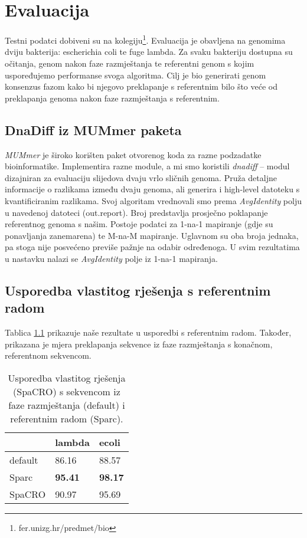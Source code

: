 \chapter{Evaluacija}
\label{sec:eval}

Testni podatci dobiveni su na kolegiju\footnote{fer.unizg.hr/predmet/bio}.
Evaluacija je obavljena na genomima dviju bakterija: escherichia coli te fuge lambda.
Za svaku bakteriju dostupna su očitanja, genom nakon faze razmještanja te referentni genom s kojim uspoređujemo performanse svoga algoritma.
Cilj je bio generirati genom konsenzus fazom kako bi njegovo preklapanje s referentnim bilo što veće od preklapanja genoma nakon faze razmještanja s referentnim.

\section{DnaDiff iz MUMmer paketa}

\emph{MUMmer} \citep{kurtz2004versatile} je široko korišten paket otvorenog koda  za razne podzadatke bioinformatike.
Implementira razne module, a mi smo koristili \emph{dnadiff} -- modul dizajniran za evaluaciju slijedova dvaju vrlo sličnih genoma.
Pruža detaljne informacije o razlikama između dvaju genoma, ali generira i high-level datoteku s kvantificiranim razlikama.
Svoj algoritam vrednovali smo prema \emph{AvgIdentity} polju u navedenoj datoteci (out.report).
Broj predstavlja prosječno poklapanje referentnog genoma s našim.
Postoje podatci za 1-na-1 mapiranje (gdje su ponavljanja zanemarena) te M-na-M mapiranje.
Uglavnom su oba broja jednaka, pa stoga nije posvećeno previše pažnje na odabir određenoga.
U svim rezultatima u nastavku nalazi se \emph{AvgIdentity} polje iz 1-na-1 mapiranja.

\section{Usporedba vlastitog rješenja s referentnim radom}

Tablica \ref{tbl:usporedba} prikazuje naše rezultate u usporedbi s referentnim radom. Također, prikazana je mjera preklapanja sekvence iz faze razmještanja s konačnom, referentnom sekvencom.

\begin{table}[]
\centering
\caption{Usporedba vlastitog rješenja (SpaCRO) s sekvencom iz faze razmještanja (default) i referentnim radom (Sparc).}
\label{tbl:usporedba}
\begin{tabular}{l|ll}
  & \multicolumn{1}{l}{lambda} & ecoli \\ \hline
  default & 86.16                       & 88.57 \\
  Sparc   & \textbf{95.41}              & \textbf{98.17} \\
  SpaCRO  & 90.97                       & 95.69
\end{tabular}
\end{table}


